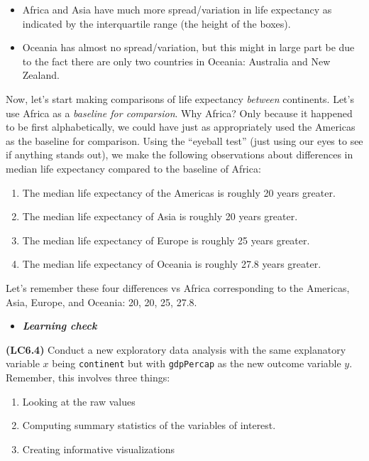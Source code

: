 \documentclass[12pt,]{krantz}
\providecommand{\tightlist}{%
  \setlength{\itemsep}{0pt}\setlength{\parskip}{0pt}}
\newenvironment{rmdblock}[1]
  {\begin{shaded*}
  \begin{itemize}
  \renewcommand{\labelitemi}{
    \raisebox{-.7\height}[0pt][0pt]{
    }
  }
  \item
  }
  {
  \end{itemize}
  \end{shaded*}
  }
\newenvironment{learncheck}
  {\begin{rmdblock}{warning}}
  {\end{rmdblock}}
\theoremstyle{definition}
\theoremstyle{definition}
\theoremstyle{definition}
\theoremstyle{remark}
\begin{document}
\begin{itemize}
\tightlist
\item
  Africa and Asia have much more spread/variation in life expectancy as
  indicated by the interquartile range (the height of the boxes).
\item
  Oceania has almost no spread/variation, but this might in large part
  be due to the fact there are only two countries in Oceania: Australia
  and New Zealand.
\end{itemize}

Now, let's start making comparisons of life expectancy \emph{between}
continents. Let's use Africa as a \emph{baseline for comparsion}. Why
Africa? Only because it happened to be first alphabetically, we could
have just as appropriately used the Americas as the baseline for
comparison. Using the ``eyeball test'' (just using our eyes to see if
anything stands out), we make the following observations about
differences in median life expectancy compared to the baseline of
Africa:

\begin{enumerate}
\def\labelenumi{\arabic{enumi}.}
\tightlist
\item
  The median life expectancy of the Americas is roughly 20 years
  greater.
\item
  The median life expectancy of Asia is roughly 20 years greater.
\item
  The median life expectancy of Europe is roughly 25 years greater.
\item
  The median life expectancy of Oceania is roughly 27.8 years greater.
\end{enumerate}

Let's remember these four differences vs Africa corresponding to the
Americas, Asia, Europe, and Oceania: 20, 20, 25, 27.8.

\begin{learncheck}
\textbf{\emph{Learning check}}
\end{learncheck}

\textbf{(LC6.4)} Conduct a new exploratory data analysis with the same
explanatory variable \(x\) being \texttt{continent} but with
\texttt{gdpPercap} as the new outcome variable \(y\). Remember, this
involves three things:

\begin{enumerate}
\def\labelenumi{\alph{enumi})}
\tightlist
\item
  Looking at the raw values
\item
  Computing summary statistics of the variables of interest.
\item
  Creating informative visualizations
\end{enumerate}
\end{document}
